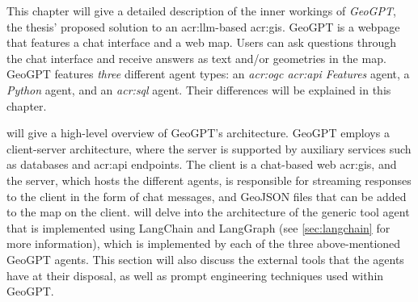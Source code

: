 \begin{comment}
\textit{Phasellus sed ipsum nunc. Nam iaculis felis mauris, sit amet condimentum ex malesuada at. Morbi lacinia odio mi, sit amet pellentesque ante facilisis sit amet. In lobortis elit ut dictum mollis. Aliquam erat volutpat. Morbi sit amet metus nisi. Nulla auctor varius metus at rhoncus. Pellentesque porta mollis leo, eu ultricies nulla mollis ac. Vivamus interdum ac odio vitae sodales. Aenean finibus eros rhoncus molestie elementum. Integer maximus erat vitae purus lobortis iaculis. Etiam blandit varius nulla, sed euismod felis.}

Clearly, a figure showing the architecture is a must, such as Figure~\ref{fig:Architecture}.
Describe all parts of such a figure in reasonable detail in the text, possibly with forward pointers to sections where they will be elaborated on (or backward pointers to sections where tools and methods already have been introduced).
Mention work that motivated your architectural choices, parameter settings, etc.
Those choices should then also be discussed and elaborated on in the Discussion chapter.

\begin{figure}[t!]
    \centering
    \missingfigure{Architecture figure to be added}
    \caption{The missing architecture}
    \label{fig:Architecture}
\end{figure}
\end{comment}

This chapter will give a detailed description of the inner workings of \textit{GeoGPT}, the thesis' proposed solution to an \acrshort{acr:llm}-based \acrshort{acr:gis}. GeoGPT is a webpage that features a chat interface and a web map. Users can ask questions through the chat interface and receive answers as text and/or geometries in the map. GeoGPT features \textit{three} different agent types: an \textit{\acrshort{acr:ogc} \acrshort{acr:api} Features} agent, a \textit{Python} agent, and an \textit{\acrshort{acr:sql}} agent. Their differences will be explained in this chapter.

 will give a high-level overview of GeoGPT's architecture. GeoGPT employs a client-server architecture, where the server is supported by auxiliary services such as databases and \acrshort{acr:api} endpoints. The client is a chat-based web \acrshort{acr:gis}, and the server, which hosts the different agents, is responsible for streaming responses to the client in the form of chat messages, and GeoJSON files that can be added to the map on the client.  will delve into the architecture of the generic tool agent that is implemented using LangChain and LangGraph (see \autoref{sec:langchain} for more information), which is implemented by each of the three above-mentioned GeoGPT agents. This section will also discuss the external tools that the agents have at their disposal, as well as prompt engineering techniques used within GeoGPT.

